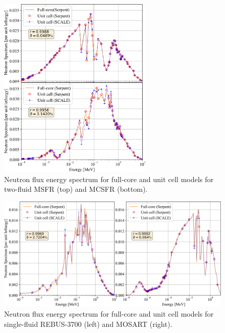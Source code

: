 \documentclass[letterpaper]{mandc2019}
\begin{document}
\begin{figure}[!htb]
  \centering
  \includegraphics[width=0.65\textwidth]{./Figures/two_full_vs_unit_spectrum.png}
   \vspace{-0.05in}
  \caption{Neutron flux energy spectrum for full-core and unit cell models for two-fluid \gls{MSFR} (top) and \gls{MCSFR} (bottom).}
  \label{fig:spectrum_two}
    \vspace{-0.45in}
\end{figure}
\begin{figure}[!htb]
  \centering
  \includegraphics[width=\textwidth]{./Figures/rebus_mosart_spectrum.png}
  	  \vspace{-0.2in}
  \caption{Neutron flux energy spectrum for full-core and unit cell models for single-fluid REBUS-3700 (left) and \gls{MOSART} (right).}
  \label{fig:spectrum_rebus}
    \vspace{-0.45in}
\end{figure}
\end{document}
